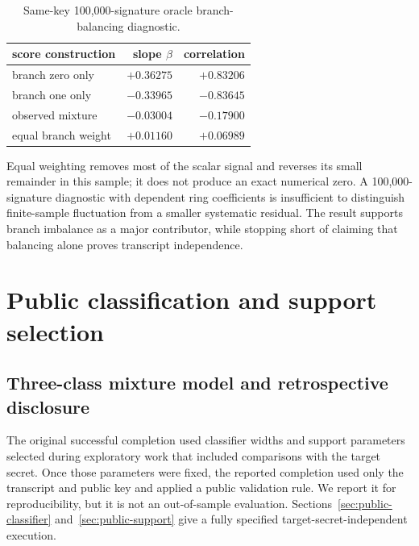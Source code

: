 \documentclass[11pt,a4paper]{article}
\begin{document}
\begin{table}[ht]
\centering
\caption{Same-key 100,000-signature oracle branch-balancing diagnostic.}
\label{tab:balance}
\begin{tabular}{lrr}
\toprule
score construction & slope $\beta$ & correlation\\
\midrule
branch zero only & $+0.36275$ & $+0.83206$\\
branch one only  & $-0.33965$ & $-0.83645$\\
observed mixture & $-0.03004$ & $-0.17900$\\
equal branch weight & $+0.01160$ & $+0.06989$\\
\bottomrule
\end{tabular}
\end{table}

Equal weighting removes most of the scalar signal and reverses its small
remainder in this sample; it does not produce an exact numerical zero.  A
100,000-signature diagnostic with dependent ring coefficients is insufficient
to distinguish finite-sample fluctuation from a smaller systematic residual.
The result supports branch imbalance as a major contributor, while stopping
short of claiming that balancing alone proves transcript independence.

\section{Public classification and support selection}
\label{sec:classification}

\subsection{Three-class mixture model and retrospective disclosure}
\label{sec:retrospective}

The original successful completion used classifier widths and support
parameters selected during exploratory work that included comparisons with
the target secret.  Once those parameters were fixed, the reported completion
used only the transcript and public key and applied a public validation rule.
We report it for reproducibility, but it is not an out-of-sample evaluation.
Sections~\ref{sec:public-classifier} and~\ref{sec:public-support} give a fully
specified target-secret-independent execution.
\end{document}
